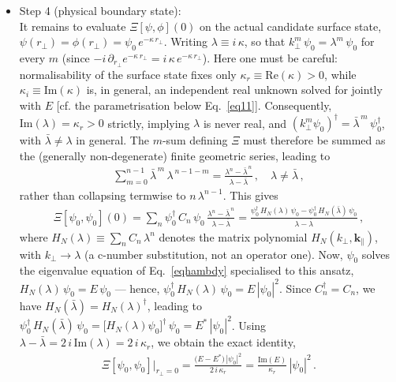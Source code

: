 \documentclass[aps,prb,onecolumn, footinbib, 10pt]{revtex4-2}
\begin{document}
{{\begin{itemize}
\item  Step 4 (physical boundary state): 
\\It remains to evaluate $\Xi[\psi,\phi](0)$ on the actual candidate surface state, $\psi(r_\perp)=\phi(r_\perp)=\psi_0\, e^{-\kappa \, r_\perp}$. Writing  $\lambda \equiv i\, \kappa$, so that $k_\perp^m\, \psi_0=\lambda^m \, \psi_0$ for every $m$ (since $-i \, \partial_{r_\perp} e^{-\kappa \, r_\perp}=i\, \kappa\, e^{-\kappa \, r_\perp}$). Here one must be careful: normalisability of the surface state fixes only $\kappa_r\equiv\mathrm{Re}(\kappa)>0$, while $\kappa_i \equiv\mathrm{Im}(\kappa)$ is, in general, an independent real unknown solved for jointly with $E$ [cf. the parametrisation below Eq.~\eqref{eq11}]. Consequently, $\mathrm{Im}(\lambda)=\kappa_r>0$ strictly, implying $\lambda$ is never real, and $(k_\perp^m\psi_0)^\dagger=\bar\lambda^{\,m} \, \psi_0^\dagger$, with $\bar\lambda\ne\lambda$ in general. The $m$-sum defining $\Xi$ must therefore be summed as the (generally non-degenerate) finite geometric series, leading to
\begin{align}
\sum_{m=0}^{n-1}\bar\lambda^{\,m} \,\lambda^{\,n-1-m}
= \frac{\lambda^n-\bar\lambda^{\,n}}{\lambda-\bar\lambda}\,,\quad \lambda\ne\bar\lambda\,,
\end{align}
rather than collapsing termwise to $n \,\lambda^{n-1}$. This gives
\begin{align}
\Xi[\psi_0,\psi_0](0)=\sum_n \psi_0^\dagger \, C_n \,\psi_0\,
\frac{\lambda^n-\bar\lambda^{\,n}}{\lambda-\bar\lambda}
=\frac{\psi_0^\dagger \,H_N(\lambda)\,\psi_0-\psi_0^\dagger \, H_N(\bar\lambda)\,\psi_0}{\lambda-\bar\lambda}\,,
\end{align}
where $H_N(\lambda)\equiv \sum_n C_n \, \lambda^n$ denotes the matrix polynomial $H_N(k_\perp,\boldsymbol k_\parallel)$, with $k_\perp\to\lambda$ (a c-number substitution, not an operator one). Now, $\psi_0$ solves the eigenvalue equation of Eq.~\eqref{eqhambdy} specialised to this ansatz, $H_N(\lambda)\, \psi_0=E \, \psi_0$ --- hence, $\psi_0^\dagger \,H_N(\lambda) \,\psi_0=E\,|\psi_0|^2$.
Since $C_n^\dagger=C_n$, we have $H_N(\bar\lambda)=H_N(\lambda)^\dagger$, leading to $\psi_0^\dagger\, H_N(\bar\lambda)\,\psi_0
=\big[H_N(\lambda)\psi_0\big]^\dagger \, \psi_0 =E^*\, |\psi_0|^2$. Using $\lambda-\bar\lambda=2 \, i\,\mathrm{Im}(\lambda)=2 \,i \,\kappa_r$, we obtain the exact identity,
\begin{align}
\Xi[\psi_0,\psi_0]\big\vert_{r_\perp=0}=\frac{\big(E-E^*\big)\,|\psi_0|^2}{2\, i\, \kappa_r}
=\frac{\mathrm{Im}(E)}{\kappa_r}\,|\psi_0|^2\,.

\end{align}
\end{itemize}}}
\end{document}
